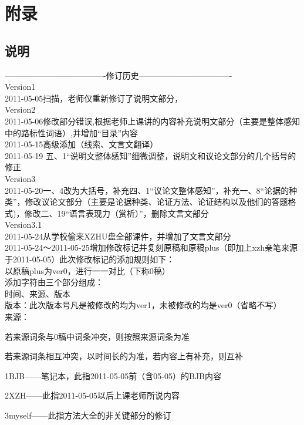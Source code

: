 \appendix
{}
\section{附录}
\subsection{说明}
-------------------------------------修订历史----------------------------------\\
Version1\\
2011-05-05扫描，老师仅重新修订了说明文部分，\\
Version2\\
2011-05-06修改部分错误,根据老师上课讲的内容补充说明文部分（主要是整体感知中的路标性词语）,并增加“目录”内容\\
2011-05-15高级添加（线索、文言文翻译）\\
2011-05-19 五、1“说明文整体感知”细微调整，说明文和议论文部分的几个括号的修正\\
Version3\\
2011-05-20一、4改为大括号，补充四、1“议论文整体感知”，补充一、8“论据的种类”，修改议论文部分（主要是论据种类、论证方法、论证结构以及他们的答题格式)，修改二、19“语言表现力（赏析）”，删除文言文部分\\
Version3.1\\
2011-05-24从学校偷来XZHU盘全部课件，并增加了文言文部分\\
2011-05-24～2011-05-25增加修改标记并复刻原稿和原稿plus（即加上xzh亲笔来源于2011-05-05）此次修改标记的添加规则如下：\\
以原稿plus为ver0，进行一一对比（下称0稿）\\
添加字符由三个部分组成：\\
时间、来源、版本\\
版本：此次版本号凡是被修改的均为ver1，未被修改的均是ver0（省略不写）\\
来源：\begin{asparaitem}
      \item 若来源词条与0稿中词条冲突，则按照来源词条为准\\
      \item 若来源词条相互冲突，以时间长的为准，若内容上有补充，则互补\\
      \item 1BJB——笔记本，此指2011-05-05前（含05-05）的BJB内容\\
      \item 2XZH——此指2011-05-05以后上课老师所说内容\\
      \item 3myself——此指方法大全的非关键部分的修订\\
      \end{asparaitem}

